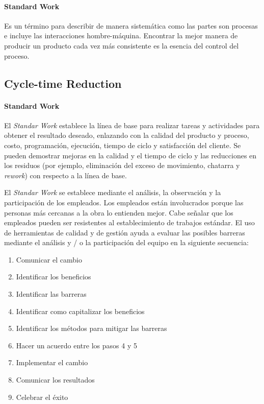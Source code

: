 \documentclass[]{article}
\begin{document}
\paragraph{Standard Work}
Es un término para describir de manera sistemática como las partes son procesas e incluye las interacciones hombre-máquina. Encontrar la mejor manera de producir un producto cada vez más consistente es la esencia del control del proceso.

\subsection{Cycle-time Reduction}

\paragraph{Standard Work}
El \textit{Standar Work} establece la línea de base para realizar tareas y actividades para obtener el resultado deseado, enlazando con la calidad del producto y proceso, costo, programación, ejecución, tiempo de ciclo y satisfacción del cliente. Se pueden demostrar mejoras en la calidad y el tiempo de ciclo y las reducciones en los residuos (por ejemplo, eliminación del exceso de movimiento, chatarra y \textit{rework}) con respecto a la línea de base.

El \textit{Standar Work} se establece mediante el análisis, la observación y la participación de los empleados. Los empleados están involucrados porque las personas más cercanas a la obra lo entienden mejor. Cabe señalar que los empleados pueden ser resistentes al establecimiento de trabajos estándar. El uso de herramientas de calidad y de gestión ayuda a evaluar las posibles barreras mediante el análisis y / o la participación del equipo en la siguiente secuencia:

\begin{enumerate}
	\item Comunicar el cambio
	\item Identificar los beneficios
	\item Identificar las barreras
	\item Identificar como capitalizar los beneficios
	\item Identificar los métodos para mitigar las barreras
	\item Hacer un acuerdo entre los pasos 4 y 5
	\item Implementar el cambio
	\item Comunicar los resultados
	\item Celebrar el éxito
\end{enumerate}
\end{document}
